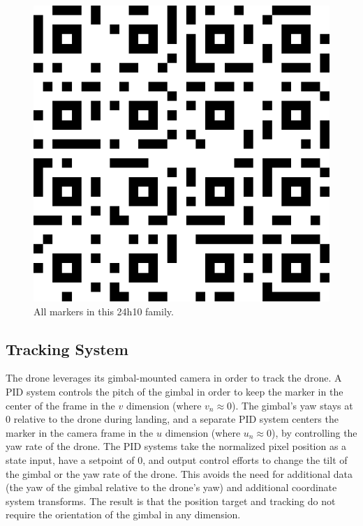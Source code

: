 \begin{figure}
    \begin{mdframed}[backgroundcolor=gray!50,linecolor=gray!50]
    \centering
    \includegraphics[width=0.75\columnwidth]{images/tag24h10_mosaic.png}
    \end{mdframed}
    \caption{All markers in this 24h10 family.}
    \label{figure:apriltag_24h10_mosaic}
\end{figure}

\subsection{Tracking System}

The drone leverages its gimbal-mounted camera in order to track the drone.
A PID system controls the pitch of the gimbal in order to keep the marker in the center of the frame in the $v$ dimension (where $v_n \approx 0$).
The gimbal's yaw stays at $0$ relative to the drone during landing,
and a separate PID system centers the marker in the camera frame in the $u$ dimension (where $u_n \approx 0$),
by controlling the yaw rate of the drone.
The PID systems take the normalized pixel position as a state input, have a setpoint of $0$, and output control efforts to change the tilt of the gimbal or the yaw rate of the drone.
This avoids the need for additional data (the yaw of the gimbal relative to the drone's yaw) and additional coordinate system transforms.
The result is that the position target and tracking do not require the orientation of the gimbal in any dimension.

